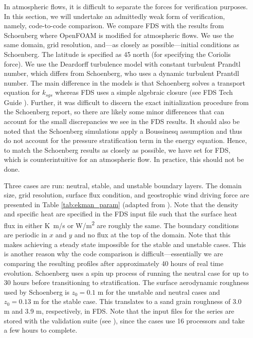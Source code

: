 \documentclass[11pt]{book}
\begin{document}
In atmospheric flows, it is difficult to separate the forces for verification purposes.  In this section, we will undertake an admittedly weak form of verification, namely, code-to-code comparison.  We compare FDS with the results from Schoenberg \cite{Schoenberg:2004} where OpenFOAM is modified for atmospheric flows.  We use the same domain, grid resolution, and---as closely as possible---initial conditions as Schoenberg.  The latitude is specified as 45\textdegree{} north (for specifying the Coriolis force).  We use the Deardorff turbulence model with constant turbulent Prandtl number, which differs from Schoenberg, who uses a dynamic turbulent Prantdl number.  The main difference in the models is that Schoenberg solves a transport equation for $k_{sgs}$ whereas FDS uses a simple algebraic closure (see FDS Tech Guide \cite{FDS_Math_Guide}).  Further, it was difficult to discern the exact initialization procedure from the Schoenberg report, so there are likely some minor differences that can account for the small discrepancies we see in the FDS results.  It should also be noted that the Schoenberg simulations apply a Boussinesq assumption and thus do not account for the pressure stratification term in the energy equation.  Hence, to match the Schoenberg results as closely as possible, we have set  for FDS, which is counterintuitive for an atmospheric flow.  In practice, this should not be done.

Three cases are run: neutral, stable, and unstable boundary layers.  The domain size, grid resolution, surface flux condition, and geostrophic wind driving force are presented in Table \ref{tab:ekman_param} (adapted from \cite{Schoenberg:2004}). Note that the density and specific heat are specified in the FDS input file such that the surface heat flux in either \unit{K.m/s} or \unit{W/m^2} are roughly the same.  The boundary conditions are periodic in $x$ and $y$ and no flux at the top of the domain.  Note that this makes achieving a steady state impossible for the stable and unstable cases.  This is another reason why the code comparison is difficult---essentially we are comparing the resulting profiles after approximately 40 hours of real time evolution.  Schoenberg uses a spin up process of running the neutral case for up to 30 hours before transitioning to stratification.  The surface aerodynamic roughness used by Schoenberg is $z_0 = 0.1$ m for the unstable and neutral cases and $z_0 = 0.13$ m for the stable case.  This translates to a sand grain roughness of 3.0 m and 3.9 m, respectively, in FDS.  Note that the input files for the  series are stored with the validation suite (see ), since the cases use 16 processors and take a few hours to complete.
\end{document}
